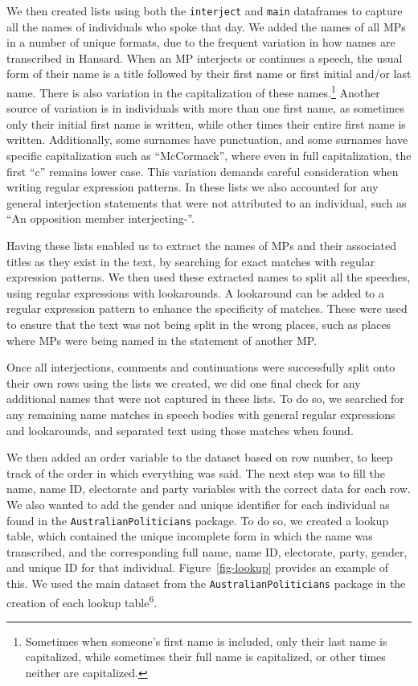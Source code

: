 \documentclass[
  letterpaper,
  DIV=11,
  numbers=noendperiod]{scrartcl}
\begin{document}
We then created lists using both the \texttt{interject} and
\texttt{main} dataframes to capture all the names of individuals who
spoke that day. We added the names of all MPs in a number of unique
formats, due to the frequent variation in how names are transcribed in
Hansard. When an MP interjects or continues a speech, the usual form of
their name is a title followed by their first name or first initial
and/or last name. There is also variation in the capitalization of these
names.\footnote{Sometimes when someone's first name is included, only
  their last name is capitalized, while sometimes their full name is
  capitalized, or other times neither are capitalized.} Another source
of variation is in individuals with more than one first name, as
sometimes only their initial first name is written, while other times
their entire first name is written. Additionally, some surnames have
punctuation, and some surnames have specific capitalization such as
``McCormack'', where even in full capitalization, the first ``c''
remains lower case. This variation demands careful consideration when
writing regular expression patterns. In these lists we also accounted
for any general interjection statements that were not attributed to an
individual, such as ``An opposition member interjecting-''.

Having these lists enabled us to extract the names of MPs and their
associated titles as they exist in the text, by searching for exact
matches with regular expression patterns. We then used these extracted
names to split all the speeches, using regular expressions with
lookarounds. A lookaround can be added to a regular expression pattern
to enhance the specificity of matches. These were used to ensure that
the text was not being split in the wrong places, such as places where
MPs were being named in the statement of another MP.

Once all interjections, comments and continuations were successfully
split onto their own rows using the lists we created, we did one final
check for any additional names that were not captured in these lists. To
do so, we searched for any remaining name matches in speech bodies with
general regular expressions and lookarounds, and separated text using
those matches when found.

We then added an order variable to the dataset based on row number, to
keep track of the order in which everything was said. The next step was
to fill the name, name ID, electorate and party variables with the
correct data for each row. We also wanted to add the gender and unique
identifier for each individual as found in the
\texttt{AustralianPoliticians} package. To do so, we created a lookup
table, which contained the unique incomplete form in which the name was
transcribed, and the corresponding full name, name ID, electorate,
party, gender, and unique ID for that individual.
Figure~\ref{fig-lookup} provides an example of this. We used the main
dataset from the \texttt{AustralianPoliticians} package in the creation
of each lookup table\textsuperscript{6}.
\end{document}
